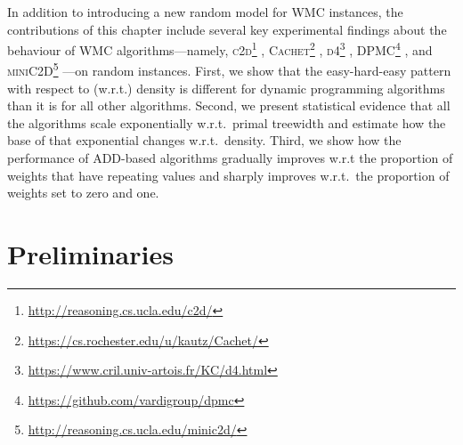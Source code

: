 In addition to introducing a new random model for WMC instances, the
contributions of this chapter include several key experimental findings about
the behaviour of WMC algorithms---namely,
\textsc{c2d}\footnote{\url{http://reasoning.cs.ucla.edu/c2d/}}
\citep{DBLP:conf/ecai/Darwiche04},
\textsc{Cachet}\footnote{\url{https://cs.rochester.edu/u/kautz/Cachet/}}
\citep{DBLP:conf/sat/SangBBKP04},
\textsc{d4}\footnote{\url{https://www.cril.univ-artois.fr/KC/d4.html}}
\citep{DBLP:conf/ijcai/LagniezM17},
\textsc{DPMC}\footnote{\url{https://github.com/vardigroup/dpmc}}
\citep{DBLP:conf/cp/DudekPV20}, and
\textsc{miniC2D}\footnote{\url{http://reasoning.cs.ucla.edu/minic2d/}}
\citep{DBLP:conf/ijcai/OztokD15}---on random instances. First, we show that the
easy-hard-easy pattern with respect to (w.r.t.) density is different for dynamic
programming algorithms than it is for all other algorithms. Second, we present
statistical evidence that all the algorithms scale exponentially w.r.t.\ primal
treewidth and estimate how the base of that exponential changes w.r.t.\ density.
Third, we show how the performance of ADD-based algorithms gradually improves
w.r.t the proportion of weights that have repeating values and sharply improves
w.r.t.\ the proportion of weights set to zero and one.


\section{Preliminaries}

